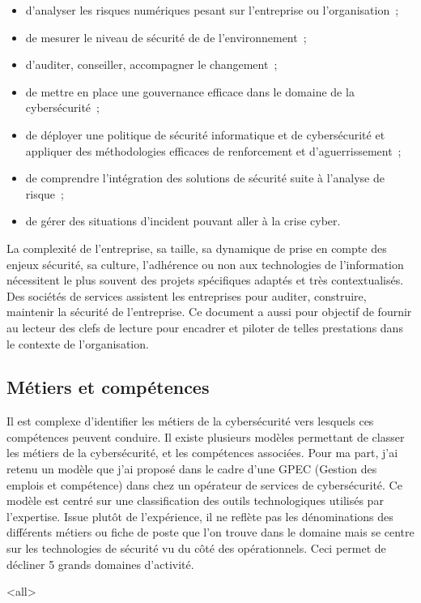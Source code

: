 \begin{itemize}
	\item d'analyser les risques numériques pesant sur l'entreprise ou l'organisation ;
	\item de mesurer le niveau de sécurité de de l'environnement ;
	\item d'auditer, conseiller, accompagner le changement ;
	\item de mettre en place une gouvernance efficace dans le domaine de la cybersécurité ;
	\item de déployer une politique de sécurité informatique et de cybersécurité et appliquer des méthodologies efficaces de renforcement et d'aguerrissement ;
	\item de comprendre l'intégration des solutions de sécurité suite à l'analyse de risque ;
	\item de gérer des situations d'incident pouvant aller à la crise cyber.
\end{itemize}
La complexité de l'entreprise, sa taille, sa dynamique de prise en compte des enjeux sécurité, sa culture, l'adhérence ou non aux technologies de l'information nécessitent le plus souvent des projets spécifiques adaptés et très contextualisés. Des sociétés de services assistent les entreprises pour auditer, construire, maintenir la sécurité de l'entreprise. Ce document a aussi pour objectif de fournir au lecteur des clefs de lecture pour encadrer et piloter de telles prestations dans le contexte de l'organisation. 


\subsection{Métiers et compétences } 
Il est complexe d'identifier les métiers de la cybersécurité vers lesquels ces compétences peuvent conduire. Il existe plusieurs modèles permettant de classer les métiers de la cybersécurité, et les compétences associées. Pour ma part,  j'ai retenu un modèle que j'ai proposé dans le cadre d'une GPEC (Gestion des emplois et compétence) dans chez un opérateur de services de cybersécurité. Ce modèle est centré sur une classification des outils technologiques utilisés par l'expertise. Issue plutôt de l'expérience, il ne reflète pas les dénominations des différents métiers ou fiche de poste que l'on trouve dans le domaine mais se centre sur les technologies de sécurité vu du côté des opérationnels. Ceci permet de décliner 5 grands domaines d'activité.

\mode<all>{}



